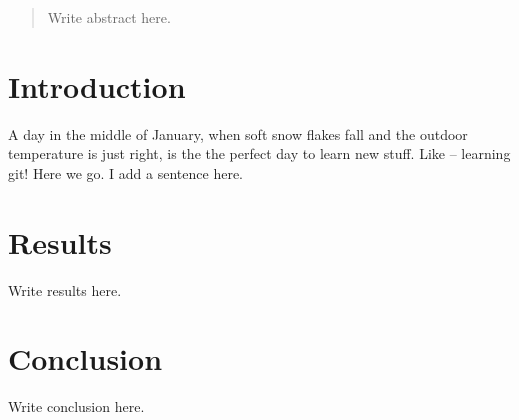 \documentclass{article}
\begin{document}
\begin{abstract}
Write abstract here.
\end{abstract}

\section{Introduction}

A day in the middle of January, when soft snow flakes fall and the outdoor temperature is just right, is the the perfect day to learn new stuff. 
Like -- learning git! Here we go. I add a sentence here. 

\section{Results}

Write results here.

\section{Conclusion}

Write conclusion here.
\end{document}
